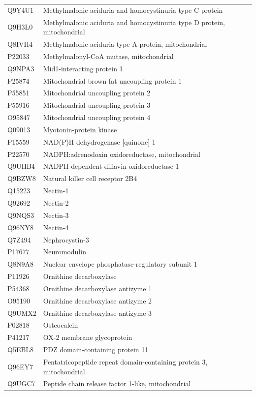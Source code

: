 \documentclass[10pt,twoside]{article}
\begin{document}
\begin{longtable}{lL{0.75\textwidth}}
Q9Y4U1	&	Methylmalonic aciduria and homocystinuria type C protein 	\\
Q9H3L0	&	Methylmalonic aciduria and homocystinuria type D protein, mitochondrial 	\\
Q8IVH4	&	Methylmalonic aciduria type A protein, mitochondrial 	\\
P22033	&	Methylmalonyl-CoA mutase, mitochondrial 	\\
Q9NPA3	&	Mid1-interacting protein 1 	\\
P25874	&	Mitochondrial brown fat uncoupling protein 1 	\\
P55851	&	Mitochondrial uncoupling protein 2 	\\
P55916	&	Mitochondrial uncoupling protein 3 	\\
O95847	&	Mitochondrial uncoupling protein 4 	\\
Q09013	&	Myotonin-protein kinase 	\\
P15559	&	NAD(P)H dehydrogenase [quinone] 1 	\\
P22570	&	NADPH:adrenodoxin oxidoreductase, mitochondrial 	\\
Q9UHB4	&	NADPH-dependent diflavin oxidoreductase 1 	\\
Q9BZW8	&	Natural killer cell receptor 2B4 	\\
Q15223	&	Nectin-1 	\\
Q92692	&	Nectin-2 	\\
Q9NQS3	&	Nectin-3 	\\
Q96NY8	&	Nectin-4 	\\
Q7Z494	&	Nephrocystin-3	\\
P17677	&	Neuromodulin 	\\
Q8N9A8	&	Nuclear envelope phosphatase-regulatory subunit 1 	\\
P11926	&	Ornithine decarboxylase 	\\
P54368	&	Ornithine decarboxylase antizyme 1 	\\
O95190	&	Ornithine decarboxylase antizyme 2 	\\
Q9UMX2	&	Ornithine decarboxylase antizyme 3 	\\
P02818	&	Osteocalcin 	\\
P41217	&	OX-2 membrane glycoprotein 	\\
Q5EBL8	&	PDZ domain-containing protein 11 	\\
Q96EY7	&	Pentatricopeptide repeat domain-containing protein 3, mitochondrial 	\\
Q9UGC7	&	Peptide chain release factor 1-like, mitochondrial 	\\

\end{longtable}
\end{document}
